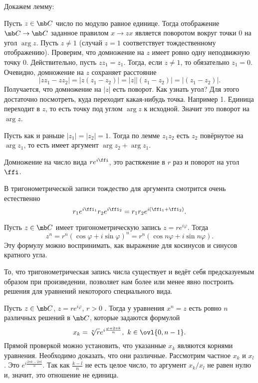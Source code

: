 Докажем лемму:

 Пусть $z\in \mb C$ число по модулю равное единице. Тогда отображение $\mb C \to \mb C$  заданное правилом $ x\to zx$   является поворотом вокруг точки 0 на угол $\arg z$.
\elm
\proof Пусть $z\neq 1$ (случай $z=1$ соответствует тождественному отображению). Проверим, что домножение на $z$ имеет ровно одну неподвижную точку 0. Действительно, пусть $zz_1=z_1$. Тогда, если $z\neq 1$, то обязательно $z_1= 0$. Очевидно, домножение на $z$ сохраняет расстояние
$$|zz_1-zz_2|=|z(z_1-z_2)|=|z||(z_1-z_2)|=|(z_1-z_2)|.$$
Получается, что домножение на $|z|$ есть поворот. Как узнать угол? Для этого достаточно посмотреть, куда переходит какая-нибудь точка. Например 1. Единица переходит в $z$, то есть точку под углом $\arg z$ к исходной. Значит это поворот на $\arg z$.
\endproof

Пусть как и раньше $|z_1|=|z_2|=1$. Тогда по лемме $z_1z_2$ есть $z_2$ повёрнутое на $\arg z_1$, то есть имеет аргумент $\arg z_2+ \arg z_1$.
\endproof

\crl
Домножение на число вида $re^{i\ffi}$, это растяжение в $r$ раз и поворот на угол $\ffi$.
\ecrl

\crl В тригонометрической записи тождество для аргумента смотрится очень естественно 
$$r_1e^{i\ffi_1}r_2e^{i\ffi_2}=r_1r_2e^{i(\ffi_1+\ffi_2)}.$$
\ecrl

 Пусть $z\in \mb C$ имеет тригонометрическую запись $z=re^{i\varphi}$. Тогда
$$z^{n}=r^{n}(\cos \varphi +i\sin \varphi )^{n}=r^{n}(\cos n\varphi +i\sin n\varphi ).$$
Эту формулу можно воспринимать, как выражение для косинусов и синусов кратного угла.
\ecrl

То, что тригонометрическая запись числа существует и ведёт себя предсказуемым образом при произведении, позволяет нам более или менее явно построить решения для уравнений некоторого специального вида.

 Пусть $z\in \mb C$, $z=re^{i\varphi}$, $r>0$ . Тогда у уравнения $x^n=z$ есть ровно $n$ различных
решений в $\mb C$, которые задаются формулой
$$ x_k =\sqrt[n]{r} e^{i\frac{\varphi + 2\pi k}{n}} ,\,\, k\in \ovl{0,n-1}.$$
\ethrm
\proof
Прямой проверкой можно установить, что указанные $x_k$ являются корнями уравнения. Необходимо доказать, что они различные. Рассмотрим частное $x_k$ и $x_l$. Это $e^{i\frac{ 2\pi k- 2\pi l}{n}}$. Так как $\frac{k-l}{n}$ не есть целое число, то аргумент $x_k/x_l$ не равен нулю и, значит, это отношение не единица.
\endproof

